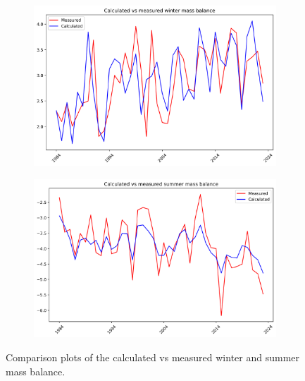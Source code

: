 \documentclass{article}
\begin{document}
\begin{figure}[h]
    \centering
    \begin{subfigure}[b]{0.49\textwidth}
        \centering
        \includegraphics[width=\textwidth]{Plots/winter_mb_compare.png}
        \label{fig:winter_mb_compare}
    \end{subfigure}
    \hfill
    \begin{subfigure}[b]{0.49\textwidth}
        \centering
        \includegraphics[width=\textwidth]{Plots/summer_mb_compare.png}
        \label{fig:summer_mb_compare}
    \end{subfigure}
    \caption{Comparison plots of the calculated vs measured winter and summer mass balance.}
    \label{fig:mb_comparison}
\end{figure}
\FloatBarrier
\end{document}
